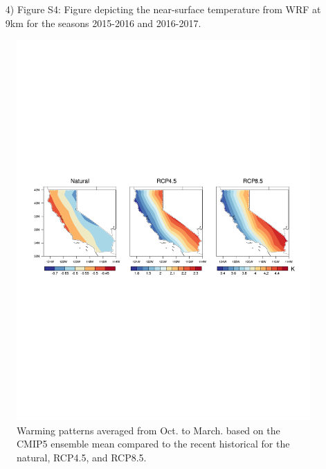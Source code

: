 \documentclass[grl]{agutexSI}
\begin{document}
\begin{article}
\begin{itemize}
\item[4)]  Figure S4: Figure depicting the near-surface temperature from WRF at 9km for the seasons 2015-2016 and 2016-2017.

\end{itemize}


%
%


%

%
%
\end{article}
\clearpage


\begin{figure}
\begin{center}
\includegraphics[width=6in]{FigS1.pdf}
\caption{Warming patterns averaged from Oct. to March. based on the CMIP5 ensemble mean compared to the recent historical for the natural, RCP4.5, and RCP8.5.}
\end{center}
\end{figure}
\end{document}

